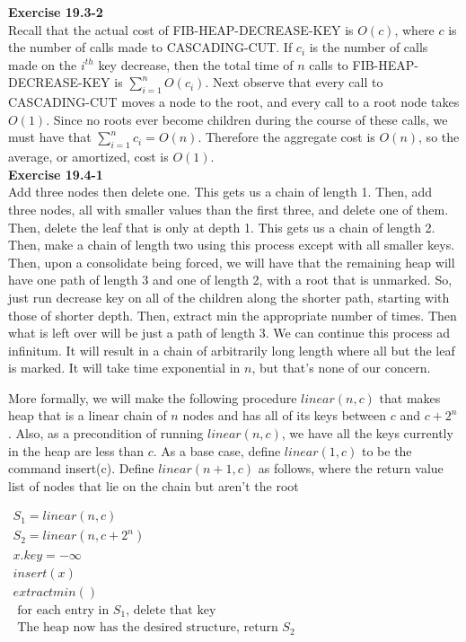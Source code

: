 \documentclass{article}
\begin{document}
\noindent\textbf{Exercise 19.3-2}\\

Recall that the actual cost of FIB-HEAP-DECREASE-KEY is $O(c)$, where $c$ is the number of calls made to CASCADING-CUT.  If $c_i$ is the number of calls made on the $i^{th}$ key decrease, then the total time of $n$ calls to FIB-HEAP-DECREASE-KEY is $\sum_{i=1}^n O(c_i)$.  Next observe that every call to CASCADING-CUT moves a node to the root, and every call to a root node takes $O(1)$.  Since no roots ever become children during the course of these calls, we must have that $\sum_{i=1}^n c_i = O(n)$.  Therefore the aggregate cost is $O(n)$, so the average, or amortized, cost is $O(1)$. \\

\noindent\textbf{Exercise 19.4-1}\\

Add three nodes then delete one. This gets us a chain of length 1. Then, add three nodes, all with smaller values than the first three, and delete one of them. Then, delete the leaf that is only at depth 1. This gets us a chain of length 2. Then, make a chain of length two using this process except with all smaller keys. Then, upon a consolidate being forced, we will have that the remaining heap will have one path of length 3 and one of length 2, with a root that is unmarked. So, just run decrease key on all of the children along the shorter path, starting with those of shorter depth. Then, extract min the appropriate number of times. Then what is left over will be just a path of length 3. We can continue this process ad infinitum. It will result in a chain of arbitrarily long length where all but the leaf is marked. It will take time exponential in $n$, but that's none of our concern. 

More formally, we will make the following procedure $linear(n,c)$ that makes heap that is a linear chain of $n$ nodes and has all of its keys between $c$ and $c+2^n$. Also, as a precondition of running $linear(n,c)$, we have all the keys currently in the heap are less than $c$. As a base case, define $linear(1,c)$ to be the command insert(c). Define $linear(n+1,c)$ as follows, where the return value list of nodes that lie on the chain but aren't the root

$
\begin{array}{l}
S_1 = linear(n,c)\\
S_2 = linear(n,c+2^n)\\
x.key = -\infty\\
insert(x)\\
extractmin()\\
\text{ for each entry in $S_1$, delete that key}\\
\text{ The heap now has the desired structure, return $S_2$}\\
\end{array}
$\\
\end{document}

